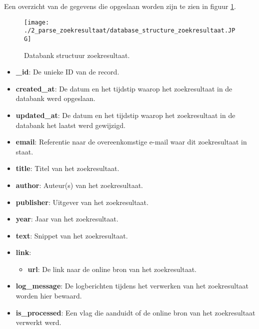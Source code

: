 Een overzicht van de gegevens die opgeslaan worden zijn te zien in figuur \ref{fig:databank_structuur_zoekresultaat}.
\begin{figure}[h!]
    \centering
    \texttt{[image: ./2\_parse\_zoekresultaat/database\_structure\_zoekresultaat.JPG]}
    \caption[Databank structuur zoekresultaat.]{\label{fig:databank_structuur_zoekresultaat}Databank structuur zoekresultaat.}
\end{figure}
\begin{itemize}
    \item \textbf{\_id}: De unieke ID van de record.
    \item \textbf{created\_at}: De datum en het tijdstip waarop het zoekresultaat in de databank werd opgeslaan.
    \item \textbf{updated\_at}: De datum en het tijdstip waarop het zoekresultaat in de databank het laatst werd gewijzigd. 
    \item \textbf{email}: Referentie naar de overeenkomstige e-mail waar dit zoekresultaat in staat.
    \item \textbf{title}: Titel van het zoekresultaat.
    \item \textbf{author}: Auteur(s) van het zoekresultaat. 
    \item \textbf{publisher}: Uitgever van het zoekresultaat.
    \item \textbf{year}: Jaar van het zoekresultaat.
    \item \textbf{text}: Snippet van het zoekresultaat.
    \item \textbf{link}: 
    \begin{itemize}
        \item \textbf{url}: De link naar de online bron van het zoekresultaat.
    \end{itemize}
    \item \textbf{log\_message}: De logberichten tijdens het verwerken van het zoekresultaat worden hier bewaard. 
    \item \textbf{is\_processed}: Een vlag die aanduidt of de online bron van het zoekresultaat verwerkt werd.
\end{itemize}

\FloatBarrier
